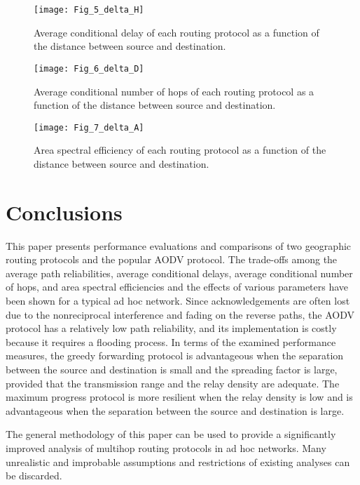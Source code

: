 \documentclass[conference]{IEEEtran}
\begin{document}
\begin{figure}[tb]\centering
\texttt{[image: Fig\_5\_delta\_H]}\caption{Average conditional delay of each routing protocol as a function of
the distance between source and destination. } \label{Fig.5}
\end{figure}

\begin{figure}[tb]\centering
\texttt{[image: Fig\_6\_delta\_D]}\caption{Average conditional number of hops of each routing protocol as a
function of the distance between source and destination.} \label{Fig.6}
\end{figure}

\begin{figure}[ptb]\centering
\texttt{[image: Fig\_7\_delta\_A]}\caption{Area spectral efficiency of each routing protocol as a function of
the distance between source and destination.} \label{Fig.7}
\end{figure}


\section{Conclusions}

This paper presents performance evaluations and comparisons of two geographic routing protocols and the
popular AODV protocol. The trade-offs among the average path reliabilities, average conditional delays, average
conditional number of hops, and area spectral efficiencies
and the effects of various parameters have been shown
for a typical ad hoc network. Since acknowledgements
are often lost due to the nonreciprocal interference and
fading on the reverse paths, the AODV protocol has a
relatively low path reliability, and its implementation
is costly because it requires a flooding process. In
terms of the examined performance measures, the greedy
forwarding protocol is advantageous when the separation
between the source and destination is small and the
spreading factor is large, provided that the transmission
range and the relay density are adequate. The maximum
progress protocol is more resilient when the relay density
is low and is advantageous when the separation between
the source and destination is large.

The general methodology of this paper can be used
to provide a significantly improved analysis of multihop
routing protocols in ad hoc networks. Many unrealistic
and improbable assumptions and restrictions of existing
analyses can be discarded.
\end{document}
